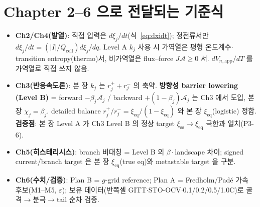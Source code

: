 \documentclass[11pt,a4paper]{article}
\newcommand{\eq}{\mathrm{eq}}
\newcommand{\app}{\mathrm{app}}
\newcommand{\cell}{\mathrm{cell}}
\begin{document}
\section{Chapter 2--6 으로 전달되는 기준식}\label{sec:transmit}
\begin{itemize}[leftmargin=1.4em]
\item \textbf{Ch2/Ch4(발열)}: 직접 입력은 $d\xi_j/dt$(식~\eqref{eq:dxidt}); 정전류서만
  $d\xi_j/dt=(|I|/Q_\cell)d\xi_j/dq$. Level A $k_j$ 사용 시 가역열은 평형 온도계수$\cdot$transition
  entropy(thermo)서, 비가역열은 flux--force $J\mathcal A\ge0$ 서. $dV_{n,\app}/dT$ 를 가역열로 직접 쓰지 않음.
\item \textbf{Ch3(반응속도론)}: 본 장 $k_j$ 는 $r_j^++r_j^-$ 의 축약. \textbf{방향성 barrier lowering
  (Level B)} = forward $-\beta_j\mathcal A_j$ / backward $+(1-\beta_j)\mathcal A_j$ 는 Ch3 에서 도입,
  본 장 $\chi_j=\beta_j$. detailed balance $r_j^+/r_j^-=\xi_\eq/(1-\xi_\eq)$ 와 본 장 $\xi_\eq$(logistic)
  정합. \textbf{검증점}: 본 장 Level A 가 Ch3 Level B 의 정상 target $\xi_\mathrm{ss}\to\xi_\eq$ 극한과
  일치(P3-6).
\item \textbf{Ch5(히스테리시스)}: branch 비대칭 = Level B 의 $\beta\cdot$landscape 차이; signed
  current/branch target 은 본 장 $\xi_\eq$(true eq)와 metastable target 을 구분.
\item \textbf{Ch6(수치/검증)}: Plan B = $g$-grid reference; Plan A = Fredholm/Pad\'e 가속 후보(M1--M5,
  $\varepsilon$); 보유 데이터(반쪽셀 GITT$\cdot$STO-OCV$\cdot$0.1/0.2/0.5/1.0C)로 골격$\to$분극$\to$tail
  순차 검증.
\end{itemize}

\end{document}
